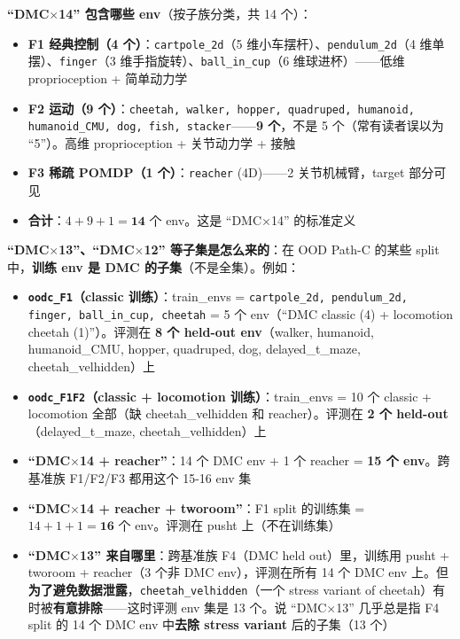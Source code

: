 \documentclass[11pt,a4paper]{article}
\begin{document}
\textbf{``DMC$\times$14'' 包含哪些 env}（按子族分类，共 14 个）：
\begin{itemize}[leftmargin=2em]
    \item \textbf{F1 经典控制（4 个）}：\texttt{cartpole\_2d}（5 维小车摆杆）、\texttt{pendulum\_2d}（4 维单摆）、\texttt{finger}（3 维手指旋转）、\texttt{ball\_in\_cup}（6 维球进杯）——低维 proprioception + 简单动力学
    \item \textbf{F2 运动（9 个）}：\texttt{cheetah, walker, hopper, quadruped, humanoid, humanoid\_CMU, dog, fish, stacker}——\textbf{9 个}，不是 5 个（常有读者误以为 ``5''）。高维 proprioception + 关节动力学 + 接触
    \item \textbf{F3 稀疏 POMDP（1 个）}：\texttt{reacher} (4D)——2 关节机械臂，target 部分可见
    \item \textbf{合计}：$4 + 9 + 1 = \mathbf{14}$ 个 env。这是 ``DMC$\times$14'' 的标准定义
\end{itemize}

\textbf{``DMC$\times$13''、``DMC$\times$12'' 等子集是怎么来的}：在 OOD Path-C 的某些 split 中，\textbf{训练 env 是 DMC 的子集}（不是全集）。例如：
\begin{itemize}[leftmargin=2em]
    \item \textbf{\texttt{oodc\_F1}（classic 训练）}：train\_envs = \texttt{cartpole\_2d, pendulum\_2d, finger, ball\_in\_cup, cheetah} = 5 个 env（``DMC classic (4) + locomotion cheetah (1)''）。评测在 \textbf{8 个 held-out env}（walker, humanoid, humanoid\_CMU, hopper, quadruped, dog, delayed\_t\_maze, cheetah\_velhidden）上
    \item \textbf{\texttt{oodc\_F1F2}（classic + locomotion 训练）}：train\_envs = 10 个 classic + locomotion 全部（缺 cheetah\_velhidden 和 reacher）。评测在 \textbf{2 个 held-out}（delayed\_t\_maze, cheetah\_velhidden）上
    \item \textbf{``DMC$\times$14 + reacher''}：14 个 DMC env + 1 个 reacher = \textbf{15 个 env}。跨基准族 F1/F2/F3 都用这个 15-16 env 集
    \item \textbf{``DMC$\times$14 + reacher + tworoom''}：F1 split 的训练集 = $14 + 1 + 1 = \mathbf{16}$ 个 env。评测在 pusht 上（不在训练集）
    \item \textbf{``DMC$\times$13'' 来自哪里}：跨基准族 F4（DMC held out）里，训练用 pusht + tworoom + reacher（3 个非 DMC env），评测在所有 14 个 DMC env 上。但\textbf{为了避免数据泄露}，\texttt{cheetah\_velhidden}（一个 stress variant of cheetah）有时被\textbf{有意排除}——这时评测 env 集是 13 个。说 ``DMC$\times$13'' 几乎总是指 F4 split 的 14 个 DMC env 中\textbf{去除 stress variant} 后的子集（13 个）
\end{itemize}
\end{document}
